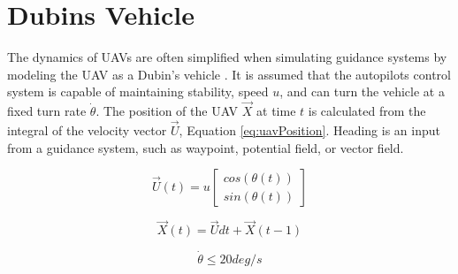 \documentclass[numbered,pdftex]{ohio-etd}
\begin{document}
\section{Dubins Vehicle}
The dynamics of UAVs are often simplified when simulating guidance systems by modeling the UAV as a Dubin's vehicle \cite{frew_cooperative_2007,griffiths_vector_2006,nelson_cooperative_2005,nelson_vector_2006,nelson_vector_2007}. It is assumed that the autopilots control system is capable of maintaining stability, speed $u$, and can turn the vehicle at a fixed turn rate $\dot{\theta}$. The position of the UAV $\overrightarrow{X}$ at time $t$ is calculated from the integral of the velocity vector $\overrightarrow{U}$, Equation \ref{eq:uavPosition}. Heading is an input from a guidance system, such as waypoint, potential field, or vector field.

\begin{equation}
\label{eq:uavVelocity}
\overrightarrow{U}(t) = u \begin{bmatrix}
cos(\theta(t)) \\
sin(\theta(t))
\end{bmatrix}
\end{equation}


\begin{equation}
\label{eq:uavPosition}
\overrightarrow{X}(t) = \overrightarrow{U}dt + \overrightarrow{X}(t-1)
\end{equation}


\begin{equation}
\label{turnRate}
\dot{\theta} \leq 20 deg/s
\end{equation}
\end{document}
